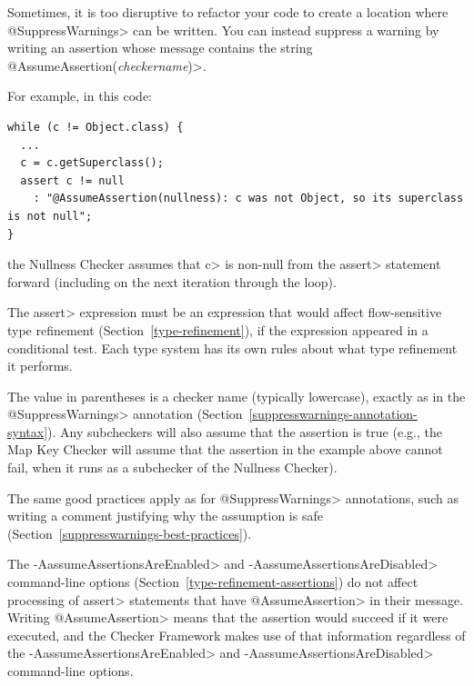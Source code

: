 
\begin{sloppypar}
Sometimes, it is too disruptive to refactor your code to create a location
where \<@SuppressWarnings> can be written.  You can instead suppress a
warning by writing an assertion whose message contains the string
\<@AssumeAssertion(\emph{checkername})>.
\end{sloppypar}

For example, in this code:

\begin{Verbatim}
while (c != Object.class) {
  ...
  c = c.getSuperclass();
  assert c != null
    : "@AssumeAssertion(nullness): c was not Object, so its superclass is not null";
}
\end{Verbatim}

\noindent
the Nullness Checker assumes that \<c> is non-null from the \<assert>
statement forward (including on the next iteration through the loop).

The \<assert> expression must be an expression that would affect flow-sensitive
type refinement (Section~\ref{type-refinement}), if the
expression appeared in a conditional test.  Each type system has its own
rules about what type refinement it performs.

The value in parentheses is a checker name (typically lowercase),
exactly as in the \<@SuppressWarnings> annotation
(Section~\ref{suppresswarnings-annotation-syntax}).
Any subcheckers will also assume that the
assertion is true (e.g., the Map Key Checker will assume that
the assertion in the example above cannot fail, when it runs
as a subchecker of the Nullness Checker).

The same good practices apply
as for \<@SuppressWarnings> annotations, such as writing a comment
justifying why the assumption is safe
(Section~\ref{suppresswarnings-best-practices}).

The \<-AassumeAssertionsAreEnabled> and \<-AassumeAssertionsAreDisabled>
command-line options (Section~\ref{type-refinement-assertions}) do not
affect processing of \<assert> statements that have \<@AssumeAssertion> in
their message.  Writing \<@AssumeAssertion> means that the assertion would
succeed if it were executed, and the Checker Framework makes use of that
information regardless of the \<-AassumeAssertionsAreEnabled> and
\<-AassumeAssertionsAreDisabled> command-line options.




